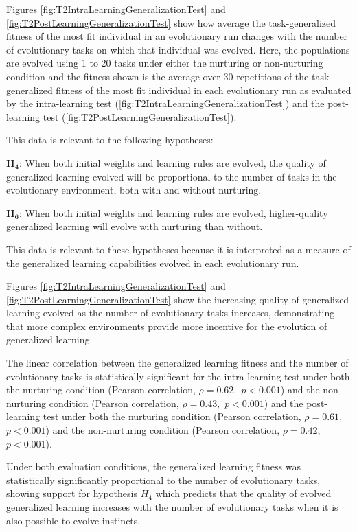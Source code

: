 \documentclass[master]{outhesis}
\begin{document}
Figures \ref{fig:T2IntraLearningGeneralizationTest} and \ref{fig:T2PostLearningGeneralizationTest} show how average the task-generalized fitness of the most fit individual in an evolutionary run changes with the number of evolutionary tasks on which that individual was evolved.
Here,
the populations are evolved using 1 to 20 tasks under either the nurturing or non-nurturing condition
and the fitness shown is the average over 30 repetitions of the task-generalized fitness of the most fit individual in each evolutionary run
as evaluated by the intra-learning test (\ref{fig:T2IntraLearningGeneralizationTest})
and the post-learning test (\ref{fig:T2PostLearningGeneralizationTest}).

This data is relevant to the following hypotheses:

$\mathbf{H_4}$: When both initial weights and learning rules are evolved, the quality of generalized learning evolved will be proportional to the number of tasks in the evolutionary environment, both with and without nurturing.

$\mathbf{H_6}$: When both initial weights and learning rules are evolved, higher-quality generalized learning will evolve with nurturing than without.

This data is relevant to these hypotheses because it is interpreted as a measure of the generalized learning capabilities evolved in each evolutionary run.

Figures \ref{fig:T2IntraLearningGeneralizationTest} and \ref{fig:T2PostLearningGeneralizationTest} show the increasing quality of generalized learning evolved as the number of evolutionary tasks increases,
demonstrating that more complex environments provide more incentive for the evolution of generalized learning.

The linear correlation between the generalized learning fitness and the number of evolutionary tasks is statistically significant for
the intra-learning test under both the nurturing condition (Pearson correlation, $\rho=0.62,$ $p < 0.001$) 
and the non-nurturing condition (Pearson correlation, $\rho=0.43,$ $p < 0.001$)
and the post-learning test under both the nurturing condition (Pearson correlation, $\rho=0.61,$ $p < 0.001$)
and the non-nurturing condition (Pearson correlation, $\rho=0.42,$ $p < 0.001$).

Under both evaluation conditions, 
the generalized learning fitness was statistically significantly proportional to the number of evolutionary tasks,
showing support for hypothesis $H_4$ which predicts that the quality of evolved generalized learning increases with the number of evolutionary tasks when it is also possible to evolve instincts.
\end{document}

